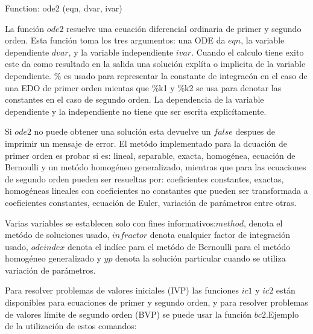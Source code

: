\documentclass[12pt]{article}
\begin{document}
Function: ode2 (eqn, dvar, ivar)

La función $ode2$ resuelve una ecuación diferencial ordinaria de primer y segundo orden. Esta función toma los tres argumentos: una ODE da $eqn$, la variable dependiente $dvar$, y la variable independiente $ivar$. Cuando el calculo tiene exito este da como resultado en la salida una solución explíta o implicita de la variable dependiente. \% es usado para representar la constante de integracón en el caso de una EDO de primer orden mientas que \%k1 y \%k2 se usa para denotar las constantes en el caso de segundo orden. La dependencia de la variable dependiente y la independiente no tiene que ser escrita explicítamente.

Si $ode2$ no puede obtener una solución esta devuelve un
$false$ despues de imprimir un mensaje de error. El metódo implementado para la dcuación de primer orden es probar si es: lineal, separable, exacta, homogénea, ecuación de Bernoulli y un metódo homogéneo generalizado, mientras que para las ecuaciones de segundo orden pueden ser resueltas por: coeficientes constantes, exactas, homogéneas lineales con coeficientes no constantes que pueden ser transformada a coeficientes constantes, ecuación de Euler, variación de parámetros entre otras.

Varias variables se establecen solo con fines informativos:$method$, denota el metódo de soluciones usado, $infractor$ denota cualquier factor de integración usado, $odeindex$ denota el indíce para el metódo de Bernoulli para el metódo homogéneo generalizado y $yp$ denota la solución particular cuando se utiliza variación de parámetros.

Para resolver problemas de valores iniciales (IVP) las funciones $ic1$ y $ic2$ están disponibles para ecuaciones de primer y segundo orden, y para resolver problemas de valores límite de segundo orden (BVP) se puede usar la función $bc2$.Ejemplo de la utilización de estos comandos:
\end{document}
